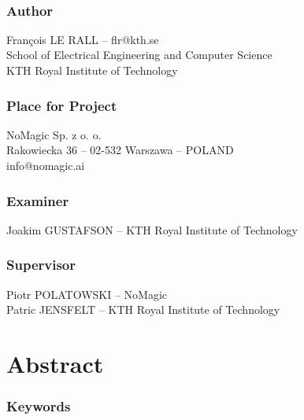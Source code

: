 \documentclass[/home/francois/latex/report/main.tex]{subfiles}
\begin{document}
\newpage
\thispagestyle{plain}

~

\vfill

{ 
	\subsection*{Author}
	François LE RALL – flr@kth.se\\
	School of Electrical Engineering and Computer Science\\
	KTH Royal Institute of Technology

	\subsection*{Place for Project}
	NoMagic Sp. z o. o.\\
	Rakowiecka 36 – 02-532 Warszawa – POLAND\\
	info@nomagic.ai

	\subsection*{Examiner}
	Joakim GUSTAFSON – KTH Royal Institute of Technology

	\subsection*{Supervisor}
	Piotr POLATOWSKI – NoMagic\\
	Patric JENSFELT – KTH Royal Institute of Technology
	~
}


\newpage
\thispagestyle{plain}
\chapter*{Abstract}

%
%

\subsection*{Keywords}
\end{document}
